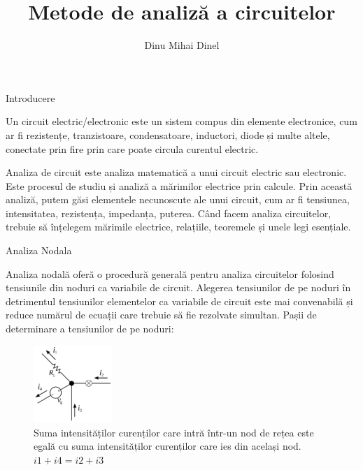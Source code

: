 \documentclass{beamer}
\title{Metode de analiză a circuitelor}
\author{Dinu Mihai Dinel}
\date{}
\begin{document}
\begin{frame}
\maketitle
\end{frame}



\begin{frame}{Introducere}
\par Un circuit electric/electronic este un sistem compus din elemente electronice, cum ar fi rezistențe, tranzistoare, condensatoare, inductori, diode și multe altele, conectate prin fire prin care poate circula curentul electric.
\par Analiza de circuit este analiza matematică a unui circuit electric sau electronic. Este procesul de studiu și analiză a mărimilor electrice prin calcule. Prin această analiză, putem găsi elementele necunoscute ale unui circuit, cum ar fi tensiunea, intensitatea, rezistența, impedanța, puterea. Când facem analiza circuitelor, trebuie să înțelegem mărimile electrice, relațiile, teoremele și unele legi esențiale.
\end{frame}


\begin{frame}{Analiza Nodala}
    \par Analiza nodală oferă o procedură generală pentru analiza circuitelor folosind tensiunile din noduri ca variabile de circuit. Alegerea tensiunilor de pe noduri în detrimentul tensiunilor elementelor ca variabile de circuit este mai convenabilă și reduce numărul de ecuații care trebuie să fie rezolvate simultan.
    Pașii de determinare a tensiunilor de pe noduri:

    \begin{figure}[h]
    \includegraphics[width=3cm]{fig1.png}
    \centering
    \caption{Suma intensităților curenților care intră într-un nod de rețea este egală cu suma intensităților curenților care ies din același nod. \(i1 + i4 = i2 + i3\)}
    \end{figure}
\end{frame}
\end{document}
